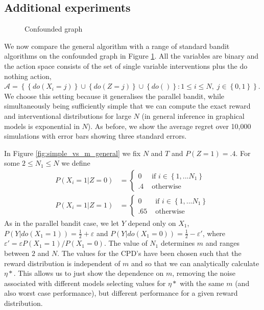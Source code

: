 \documentclass[11pt,a4paper,oneside]{book}
\newcommand{\calA}{\mathcal A}
\newcommand{\set}[1]{\left\{#1\right\}}
\newcommand{\eq}[1]{\begin{align*}#1\end{align*}}
\theoremstyle{plain}
\theoremstyle{definition}
\let\epsilon\varepsilon
\begin{document}
\subsection{Additional experiments} 
\begin{figure}[H]
	\centering    
        \caption{Confounded graph}
        \label{fig:parallel_confounded} 
\end{figure}


We now compare the general algorithm with a range of standard bandit algorithms on the confounded graph in Figure \ref{fig:parallel_confounded}. All the variables are binary and the action space consists of the set of single variable interventions plus the do nothing action, $\calA = \set{\set{do(X_i = j)} \cup \set{do(Z = j)} \cup \set{do()}: 1\leq i \leq N,\; j \in \set{0,1}}$. We choose this setting because it generalises the parallel bandit, while simultaneously being sufficiently simple that we can compute the exact reward and interventional distributions for large $N$ (in general inference in graphical models is exponential in $N$). As before, we show the average regret over 10,000 simulations with error bars showing three standard errors. 

In Figure \ref{fig:simple_vs_m_general} we fix $N$ and $T$ and $P(Z=1) = .4$. For some $2 \leq N_1 \leq N$ we define 
\eq{
P(X_i = 1|Z = 0) &= \begin{cases} 0 & \text{ if } i \in \set{1,...N_1} \\ .4 & \text{ otherwise } \end{cases}\\
P(X_i = 1|Z = 1) &= \begin{cases} 0 & \text{ if } i \in \set{1,...N_1} \\ .65 & \text{ otherwise } \end{cases}
}
As in the parallel bandit case, we let $Y$ depend only on $X_1$, $P(Y|do(X_1=1)) = \frac{1}{2} + \epsilon$ and $P(Y|do(X_1=0)) = \frac{1}{2}-\epsilon'$, where $\epsilon' = \epsilon P(X_1=1) / P(X_1=0)$. The value of $N_1$ determines $m$ and ranges between $2$ and $N$. The values for the CPD's have been chosen such that the reward distribution is independent of $m$ and so that we can analytically calculate $\eta*$. This allows us to just show the dependence on $m$, removing the noise associated with different models selecting values for $\eta*$ with the same $m$ (and also worst case performance), but different performance for a given reward distribution. 
\end{document}
